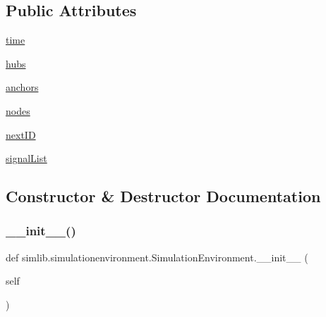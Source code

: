 \subsection*{Public Attributes}
\begin{DoxyCompactItemize}
\item 
\mbox{\hyperlink{classsimlib_1_1simulationenvironment_1_1_simulation_environment_a81ac9426bfad791fb4a1ddaebace2545}{time}}
\item 
\mbox{\hyperlink{classsimlib_1_1simulationenvironment_1_1_simulation_environment_a04ccb1a4630854739716f8a50d971ac6}{hubs}}
\item 
\mbox{\hyperlink{classsimlib_1_1simulationenvironment_1_1_simulation_environment_a0f648c8fa4432c81ced68f989f1e56f0}{anchors}}
\item 
\mbox{\hyperlink{classsimlib_1_1simulationenvironment_1_1_simulation_environment_a8aa2d5276df2d1b1c328d9adf9ad18af}{nodes}}
\item 
\mbox{\hyperlink{classsimlib_1_1simulationenvironment_1_1_simulation_environment_aa4ded233ce51afb7b40a8cd62daa3ec7}{next\+ID}}
\item 
\mbox{\hyperlink{classsimlib_1_1simulationenvironment_1_1_simulation_environment_a27aced3ffaa804598044e5f73475c63f}{signal\+List}}
\end{DoxyCompactItemize}


\subsection{Constructor \& Destructor Documentation}
\mbox{\label{classsimlib_1_1simulationenvironment_1_1_simulation_environment_a9523fb72f109de5e544efb6569f25b87}} 
\subsubsection{\texorpdfstring{\+\_\+\+\_\+init\+\_\+\+\_\+()}{\_\_init\_\_()}}
{\footnotesize\ttfamily def simlib.\+simulationenvironment.\+Simulation\+Environment.\+\_\+\+\_\+init\+\_\+\+\_\+ (\begin{DoxyParamCaption}\item[{}]{self }\end{DoxyParamCaption})}




